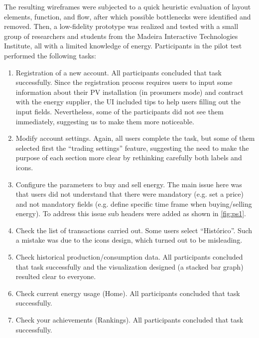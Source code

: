 The resulting wireframes were subjected to a quick heuristic evaluation of layout elements, function, and flow, after which possible bottlenecks were identified and removed. Then, a low-fidelity prototype was realized and tested with a small group of researchers and students from the Madeira Interactive Technologies Institute, all with a limited knowledge of energy.
Participants in the pilot test performed the following tasks:
\begin{enumerate}
    \item Registration of a new account. All participants concluded that task successfully. Since the registration process requires users to input some information about their \ac{PV} installation (in prosumers mode) and contract with the energy supplier, the \ac{UI} included tips to help users filling out the input fields. Nevertheless, some of the participants did not see them immediately, suggesting us to make them more noticeable. 
    \item Modify account settings. Again, all users complete the task, but some of them selected first the “trading settings” feature, suggesting the need to make the purpose of each section more clear by rethinking carefully both labels and icons.
    \item Configure the parameters to buy and sell energy. The main issue here was that users did not understand that there were mandatory (e.g. set a price) and not mandatory fields (e.g. define specific time frame when buying/selling energy). To address this issue sub headers were added as shown in \cref{fig:ps1}.
    \item Check the list of transactions carried out. Some users select “Histórico”. Such a mistake was due to the icons design, which turned out to be misleading.
    \item Check historical production/consumption data. All participants concluded that task successfully and the visualization designed (a stacked bar graph) resulted clear to everyone.
    \item Check current energy usage (Home). All participants concluded that task successfully.
    \item Check your achievements (Rankings). All participants concluded that task successfully.
\end{enumerate}


